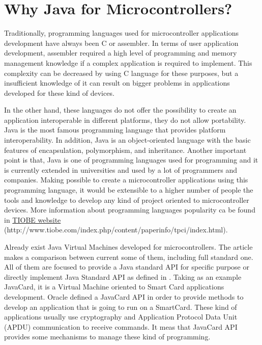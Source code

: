 \section{Why Java for Microcontrollers?}\label{S:Introduction:Why}
Traditionally, programming languages used for microcontroller applications development have always been C or assembler. In terms of user application development, assembler required a high level of programming and memory management knowledge if a complex application is required to implement. This complexity can be decreased by using C language for these purposes, but a insufficient knowledge of it can result on bigger problems in applications developed for these kind of devices.

In the other hand, these languages do not offer the possibility to create an application interoperable in different platforms, they do not allow portability. Java is the most famous programming language that provides platform interoperability. In addition, Java is an object-oriented language with the basic features of encapsulation, polymorphism, and inheritance. Another important point is that, Java is one of programming languages used for programming and it is currently extended in universities and used by a lot of programmers and companies. Making possible to create a microcontroller applications using this programming language, it would be extensible to a higher number of people the tools and knowledge to develop any kind of project oriented to microcontroller devices. More information about programming languages popularity ca be found in \href{http://www.tiobe.com/index.php/content/paperinfo/tpci/index.html}{TIOBE website} (http://www.tiobe.com/index.php/content/paperinfo/tpci/index.html).

Already exist Java Virtual Machines developed for microcontrollers. The article \cite{Art:Darjeeling} makes a comparison between current some of them, including full standard one. All of them are focused to provide a Java standard API for specific purpose or directly implement Java Standard API as defined in \cite{Art:JVMSE7}. Taking as an example JavaCard, it is a Virtual Machine oriented to Smart Card applications development. Oracle defined a JavaCard API in order to provide methods to develop an application that is going to run on a SmartCard. These kind of applications usually use cryptography and Application Protocol Data Unit (APDU) communication to receive commands. It meas that JavaCard API provides some mechanisms to manage these kind of programming.

